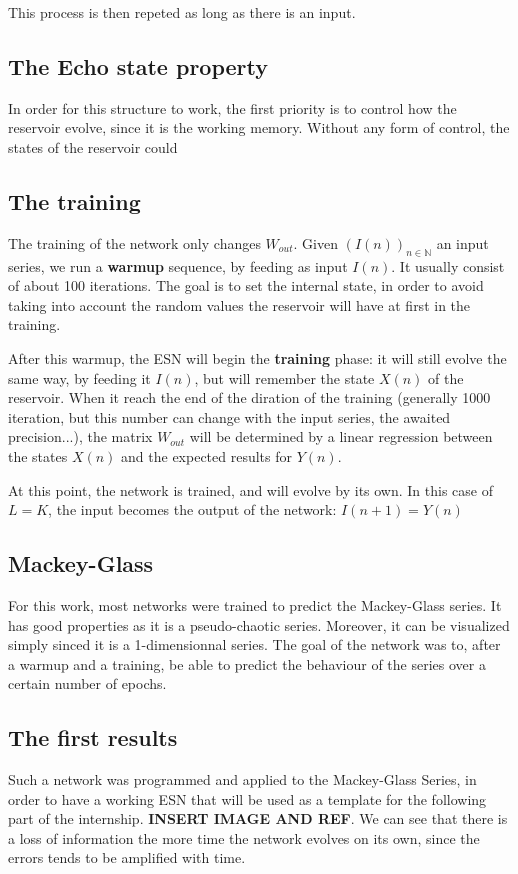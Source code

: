 \documentclass[11pt]{article}
\begin{document}
     This process is then repeted as long as there is an input.

  \subsection{The Echo state property}
     In order for this structure to work, the first priority is to control how the reservoir evolve, since it is the working memory. Without any form of control, the states of the reservoir could

  \subsection{The training}
    The training of the network only changes $W_{out}$. Given $(I(n))_{n\in \mathbb{N}}$ an input series, we run a \textbf{warmup} sequence, by feeding as input $I(n)$. It usually consist of about 100 iterations. The goal is to set the internal state, in order to avoid taking into account the random values the reservoir will have at first in the training.

    After this warmup, the ESN will begin the \textbf{training} phase: it will still evolve the same way, by feeding it $I(n)$, but will remember the state $X(n)$ of the reservoir. When it reach the end of the diration of the training (generally 1000 iteration, but this number can change with the input series, the awaited precision...), the matrix $W_{out}$ will be determined by a linear regression between the states $X(n)$ and the expected results for $Y(n)$.

    At this point, the network is trained, and will evolve by its own. In this case of $L=K$, the input becomes the output of the network: $I(n+1) = Y(n)$


  \subsection{Mackey-Glass}
    For this work, most networks were trained to predict the Mackey-Glass series. It has good properties as it is a pseudo-chaotic series. Moreover, it can be visualized simply sinced it is a 1-dimensionnal series. The goal of the network was to, after a warmup and a training, be able to predict the behaviour of the series over a certain number of epochs.

   \subsection{The first results}
      Such a network was programmed and applied to the Mackey-Glass Series, in order to have a working ESN that will be used as a template for the following part of the internship. \textbf{INSERT IMAGE AND REF}. We can see that there is a loss of information the more time the network evolves on its own, since the errors tends to be amplified with time.
\end{document}
